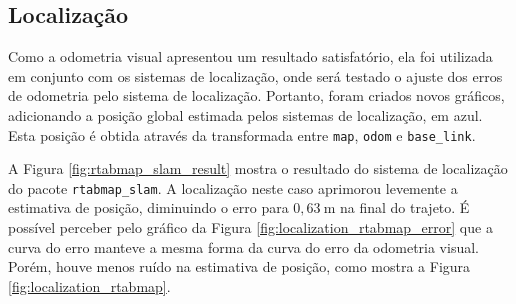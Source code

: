 \documentclass[repeatfields,xlists,xpacks,oneside,yearsonly]{ufrgscca}
\begin{document}
\subsection{Localização}

Como a odometria visual apresentou um resultado satisfatório, ela foi
utilizada em conjunto com os sistemas de localização, onde será
testado o ajuste dos erros de odometria pelo sistema de localização.
Portanto, foram criados novos gráficos, adicionando a posição global
estimada pelos sistemas de localização, em azul. Esta posição é
obtida através da transformada entre \texttt{map}, \texttt{odom} e
\texttt{base\_link}.

A Figura \ref{fig:rtabmap_slam_result} mostra o resultado do sistema
de localização do pacote \texttt{rtabmap\_slam}. A localização neste
caso aprimorou levemente a estimativa de posição, diminuindo o erro
para $0,63~\si{\meter}$ na final do trajeto. É possível perceber pelo
gráfico da Figura \ref{fig:localization_rtabmap_error} que a curva do
erro manteve a mesma forma da curva do erro da odometria visual.
Porém, houve menos ruído na estimativa de posição, como mostra a
Figura \ref{fig:localization_rtabmap}.
\end{document}
